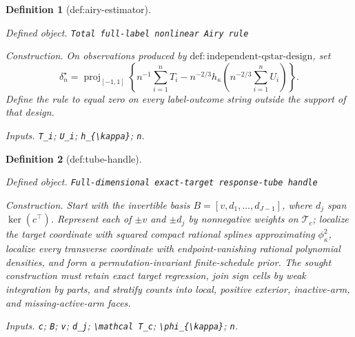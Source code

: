 \documentclass{article}
\newtheorem{definition}{Definition}
\begin{document}
\begin{definition}[def:airy-estimator]\label{def:airy-estimator}
\par\smallskip\noindent\emph{Defined object.} \texttt{Total full-\allowbreak{}label nonlinear Airy rule}
\par\smallskip\noindent\emph{Construction.} On observations produced by \(\mathrm{def:independent\text{-}qstar\text{-}design}\), set \[\delta_n^\star=\operatorname{proj}_{[-1,1]}\left\{n^{-1}\sum_{i=1}^nT_i-n^{-2/3}h_{\kappa}\left(n^{-2/3}\sum_{i=1}^nU_i\right)\right\}.\] Define the rule to equal zero on every label-outcome string outside the support of that design.
\par\smallskip\noindent\emph{Inputs.} \texttt{T\_\allowbreak{}i}; \texttt{U\_\allowbreak{}i}; \texttt{h\_\allowbreak{}\{\textbackslash{}\allowbreak{}kappa\}\allowbreak{}}; \texttt{n}.
\end{definition}

\begin{definition}[def:tube-handle]\label{def:tube-handle}
\par\smallskip\noindent\emph{Defined object.} \texttt{Full-\allowbreak{}dimensional exact-\allowbreak{}target response-\allowbreak{}tube handle}
\par\smallskip\noindent\emph{Construction.} Start with the invertible basis \(B=[v,d_1,\ldots,d_{J-1}]\), where \(d_j\) span \(\ker(c^\top)\). Represent each of \(\pm v\) and \(\pm d_j\) by nonnegative weights on \(\mathcal T_c\); localize the target coordinate with squared compact rational splines approximating \(\phi_{\kappa}^2\), localize every transverse coordinate with endpoint-vanishing rational polynomial densities, and form a permutation-invariant finite-schedule prior. The sought construction must retain exact target regression, join sign cells by weak integration by parts, and stratify counts into local, positive exterior, inactive-arm, and missing-active-arm faces.
\par\smallskip\noindent\emph{Inputs.} \texttt{c}; \texttt{B}; \texttt{v}; \texttt{d\_\allowbreak{}j}; \texttt{\textbackslash{}\allowbreak{}mathcal T\_\allowbreak{}c}; \texttt{\textbackslash{}\allowbreak{}phi\_\allowbreak{}\{\textbackslash{}\allowbreak{}kappa\}\allowbreak{}}; \texttt{n}.
\end{definition}
\end{document}
